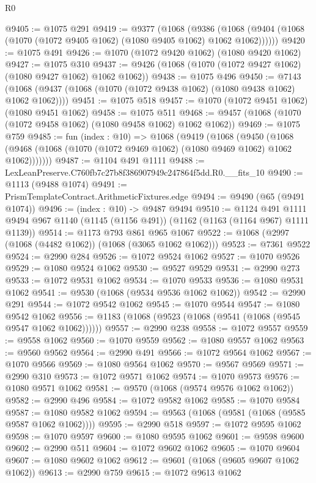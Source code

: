 \begin{lexlean}{R0}
\begin{coremodule}
@9405 := @1075 @291
@9419 := @9377
    (@1068
      (@9386 (@1068 (@9404 (@1068 (@1070 (@1072 @9405 @1062) (@1080 @9405 @1062) @1062 @1062))))))
@9420 := @1075 @491
@9426 := @1070 (@1072 @9420 @1062) (@1080 @9420 @1062)
@9427 := @1075 @310
@9437 := @9426 (@1068 (@1070 (@1072 @9427 @1062) (@1080 @9427 @1062) @1062 @1062))
@9438 := @1075 @496
@9450 := @7143 (@1068 (@9437 (@1068 (@1070 (@1072 @9438 @1062) (@1080 @9438 @1062) @1062 @1062))))
@9451 := @1075 @518
@9457 := @1070 (@1072 @9451 @1062) (@1080 @9451 @1062)
@9458 := @1075 @511
@9468 := @9457 (@1068 (@1070 (@1072 @9458 @1062) (@1080 @9458 @1062) @1062 @1062))
@9469 := @1075 @759
@9485 := fun (index : @10) =>
  @1068
    (@9419
      (@1068
        (@9450
          (@1068 (@9468 (@1068 (@1070 (@1072 @9469 @1062) (@1080 @9469 @1062) @1062 @1062)))))))
@9487 := @1104 @491 @1111
@9488 := LexLeanPreserve.C760fb7c27b8f386907949c247864f5dd.R0.__fits_10
@9490 := @1113 (@9488 @1074)
@9491 := PrismTemplateContract.ArithmeticFixtures.edge
@9494 := @9490 (@65 (@9491 @1074))
@9496 := (index : @10) -> @9487 @9494
@9510 := @1124
    @491
    @1111
    @9494
    @967
    @1140
    (@1145 (@1156 @491))
    (@1162 (@1163 (@1164 @967) @1111 @1139))
@9514 := @1173 @793 @861 @965 @1067
@9522 := @1068 (@2997 (@1068 (@4482 @1062)) (@1068 (@3065 @1062 @1062)))
@9523 := @7361 @9522
@9524 := @2990 @284
@9526 := @1072 @9524 @1062
@9527 := @1070 @9526
@9529 := @1080 @9524 @1062
@9530 := @9527 @9529
@9531 := @2990 @273
@9533 := @1072 @9531 @1062
@9534 := @1070 @9533
@9536 := @1080 @9531 @1062
@9541 := @9530 (@1068 (@9534 @9536 @1062 @1062))
@9542 := @2990 @291
@9544 := @1072 @9542 @1062
@9545 := @1070 @9544
@9547 := @1080 @9542 @1062
@9556 := @1183 (@1068 (@9523 (@1068 (@9541 (@1068 (@9545 @9547 @1062 @1062))))))
@9557 := @2990 @238
@9558 := @1072 @9557
@9559 := @9558 @1062
@9560 := @1070 @9559
@9562 := @1080 @9557 @1062
@9563 := @9560 @9562
@9564 := @2990 @491
@9566 := @1072 @9564 @1062
@9567 := @1070 @9566
@9569 := @1080 @9564 @1062
@9570 := @9567 @9569
@9571 := @2990 @310
@9573 := @1072 @9571 @1062
@9574 := @1070 @9573
@9576 := @1080 @9571 @1062
@9581 := @9570 (@1068 (@9574 @9576 @1062 @1062))
@9582 := @2990 @496
@9584 := @1072 @9582 @1062
@9585 := @1070 @9584
@9587 := @1080 @9582 @1062
@9594 := @9563 (@1068 (@9581 (@1068 (@9585 @9587 @1062 @1062))))
@9595 := @2990 @518
@9597 := @1072 @9595 @1062
@9598 := @1070 @9597
@9600 := @1080 @9595 @1062
@9601 := @9598 @9600
@9602 := @2990 @511
@9604 := @1072 @9602 @1062
@9605 := @1070 @9604
@9607 := @1080 @9602 @1062
@9612 := @9601 (@1068 (@9605 @9607 @1062 @1062))
@9613 := @2990 @759
@9615 := @1072 @9613 @1062

\end{coremodule}
\end{lexlean}
